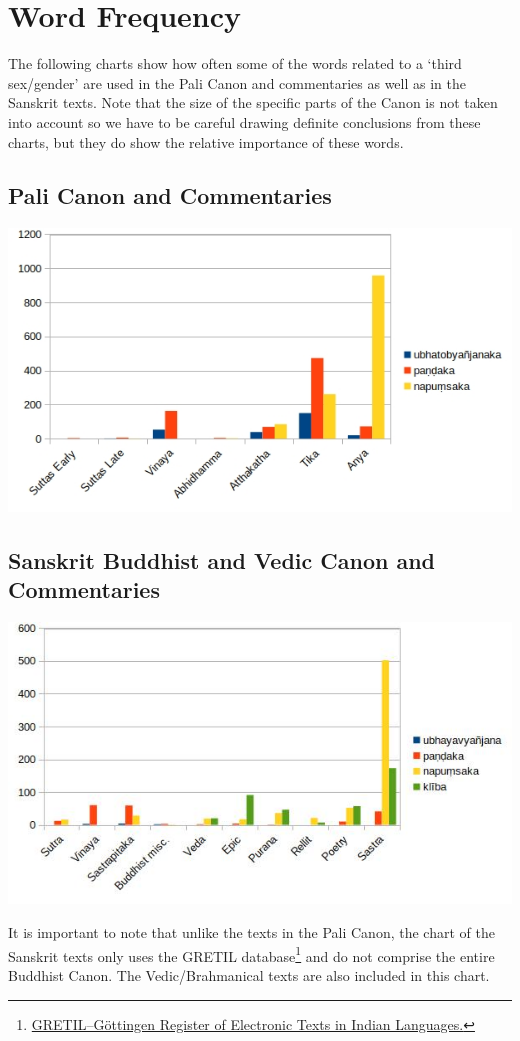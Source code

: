 \section{Word Frequency}
\label{appendix2}

The following charts show how often some of the words related to a `third sex/gender' are used in the Pali Canon and commentaries as well as in the Sanskrit texts. Note that the size of the specific parts of the Canon is not taken into account so we have to be careful drawing definite conclusions from these charts, but they do show the relative importance of these words. 

\subsection{Pali Canon and Commentaries}

\includegraphics[width=0.7\linewidth]{pali.jpg}

\begin{minipage}{0.8\linewidth}
\end{minipage}
\label{pali1}

\subsection{Sanskrit Buddhist and Vedic Canon and Commentaries}

\includegraphics[width=0.7\linewidth]{sanskrit.jpg}

\begin{minipage}{0.7\linewidth}
\end{minipage}
\label{sanskrit1}

\medskip
It is important to note that unlike the texts in the Pali Canon, the chart of the Sanskrit texts only uses the GRETIL database\footnote{\href{http://gretil.sub.uni-goettingen.de/gretil.html}{GRETIL--Göttingen Register of Electronic Texts in Indian Languages.}} and do not comprise the entire Buddhist Canon. The Vedic/Brahmanical texts are also included in this chart.
